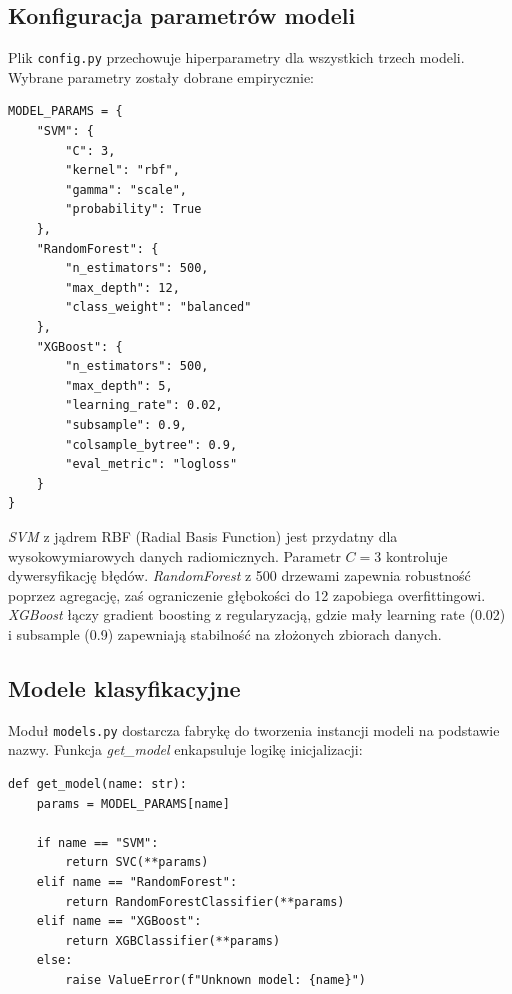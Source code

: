 \documentclass[12pt]{article}
\begin{document}
\subsection{Konfiguracja parametrów modeli}

Plik \texttt{config.py} przechowuje hiperparametry dla wszystkich trzech modeli. Wybrane parametry zostały dobrane empirycznie:

\begin{lstlisting}[caption={\texttt{src/config.py} (linie 9--29): Hiperparametry modeli klasyfikacyjnych}]
MODEL_PARAMS = {
    "SVM": {
        "C": 3,
        "kernel": "rbf",
        "gamma": "scale",
        "probability": True
    },
    "RandomForest": {
        "n_estimators": 500,
        "max_depth": 12,
        "class_weight": "balanced"
    },
    "XGBoost": {
        "n_estimators": 500,
        "max_depth": 5,
        "learning_rate": 0.02,
        "subsample": 0.9,
        "colsample_bytree": 0.9,
        "eval_metric": "logloss"
    }
}
\end{lstlisting}

\noindent
\begin{tcolorbox}[colframe=blue!75!black, colback=blue!10, title={\large Wybór hiperparametrów}, fonttitle=\bfseries]
\textit{SVM} z jądrem RBF (Radial Basis Function) jest przydatny dla wysokowymiarowych danych radiomicznych. Parametr $C=3$ kontroluje dywersyfikację błędów. \textit{RandomForest} z 500 drzewami zapewnia robustność poprzez agregację, zaś ograniczenie głębokości do 12 zapobiega overfittingowi. \textit{XGBoost} łączy gradient boosting z regularyzacją, gdzie mały learning rate (0.02) i subsample (0.9) zapewniają stabilność na złożonych zbiorach danych.
\end{tcolorbox}

\subsection{Modele klasyfikacyjne}

Moduł \texttt{models.py} dostarcza fabrykę do tworzenia instancji modeli na podstawie nazwy. Funkcja \textit{get\_model} enkapsuluje logikę inicjalizacji:

\begin{lstlisting}[caption={\texttt{src/models.py} (linie 8--18): Fabryka modeli}]
def get_model(name: str):
    params = MODEL_PARAMS[name]

    if name == "SVM":
        return SVC(**params)
    elif name == "RandomForest":
        return RandomForestClassifier(**params)
    elif name == "XGBoost":
        return XGBClassifier(**params)
    else:
        raise ValueError(f"Unknown model: {name}")
\end{lstlisting}
\end{document}
